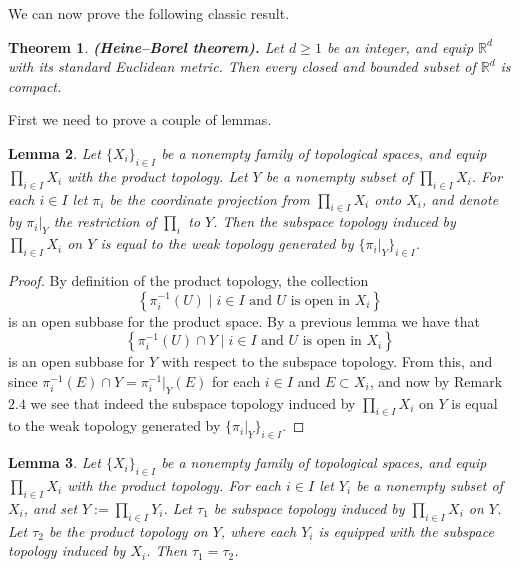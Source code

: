 \documentclass[11pt,a4paper]{article}
\theoremstyle{definition}
\theoremstyle{plain}
\newtheorem{theorem}{Theorem}[section]
\newtheorem{lemma}[theorem]{Lemma}
\newcommand{\R}{\mathbb{R}}
\newcommand{\set}[2]{ \left\{ #1 \mid #2 \right\} }
\renewcommand{\tt}[1]{\textnormal{\textbf{(#1).}}} %
\begin{document}
	We can now prove the following classic result.
	\begin{theorem}
		\tt{Heine–Borel theorem}
		Let $d \geq 1$ be an integer, and equip $\R^d$ with its standard 
		Euclidean metric. Then every closed and bounded subset of $\R^d$ is
		compact.
	\end{theorem}
	First we need to prove a couple of lemmas.
	\begin{lemma}
		Let $\{X_i\}_{i \in I}$ be a nonempty family of topological spaces, 
		and equip $\prod_{i \in I}{X_i}$ with the product topology. Let $Y$ be 
		a nonempty subset of $\prod_{i \in I}{X_i}$. For each $i \in I$ let 
		$\pi_i$ be the coordinate projection from $\prod_{i \in I}{X_i}$ onto 
		$X_i$, and denote by $\pi_i\vert_Y$ the restriction of $\prod_i$ to $Y$.
		Then the subspace topology induced by $\prod_{i \in I}{X_i}$ on $Y$ is 
		equal to the weak topology generated by $\{\pi_i \vert_Y\}_{i \in I}$.
	\end{lemma}
	\begin{proof}
		By definition of the product topology, the collection
		\[
			\set{\pi_{i}^{-1}(U)}{\text{$i \in I$ and $U$ is open in $X_i$}}
		\]
		is an open subbase for the product space. By a previous lemma
		we have that
		\[
			\set{\pi_{i}^{-1}(U) \cap Y}
			{\text{$i \in I$ and $U$ is open in $X_i$}}
		\]
		is an open subbase for $Y$ with respect to the subspace topology.
		From this, and since $\pi_{i}^{-1}(E) \cap Y = \pi_{i}^{-1} \vert_Y(E)$
		for each $i \in I$ and $E \subset X_i$, and now by Remark $2.4$ we
		see that indeed the subspace topology induced by $\prod_{i \in I}{X_i}$ 
		on $Y$ is equal to the weak topology generated by 
		$\{\pi_i \vert_Y\}_{i \in I}$.
	\end{proof}
	\begin{lemma}
		Let $\{X_i\}_{i \in I}$ be a nonempty family of topological spaces, 
		and equip $\prod_{i \in I}{X_i}$ with the product topology. For each 
		$i \in I$ let $Y_i$ be a nonempty subset of $X_i$, and set 
		$Y := \prod_{i \in I}{Y_i}$. Let $\tau_1$ be subspace topology induced 
		by $\prod_{i \in I}{X_i}$ on $Y$. Let $\tau_2$ be the product topology 
		on $Y$, where each $Y_i$ is equipped with the subspace topology induced 
		by $X_i$. Then $\tau_1 = \tau_2$.
	\end{lemma}
\end{document}
